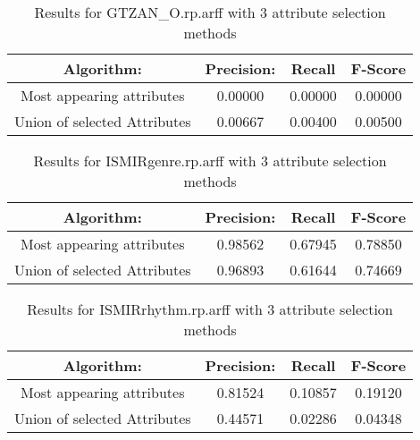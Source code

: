 \begin{table}[p]
\begin{center}
\begin{tabular}{|c|c|c|c|}
\hline Algorithm: & Precision: & Recall & F-Score\\
\hline Most appearing attributes & 0.00000 & 0.00000 & 0.00000\\
\hline Union of selected Attributes & 0.00667 & 0.00400 & 0.00500\\

\hline
\end{tabular}
\caption{Results for GTZAN\_O.rp.arff with 3 attribute selection methods}
\label{table:classifier:GTZAN\_O3}
\end{center}
\end{table}


\begin{table}[p]
\begin{center}
\begin{tabular}{|c|c|c|c|}
\hline Algorithm: & Precision: & Recall & F-Score\\
\hline Most appearing attributes & 0.98562 & 0.67945 & 0.78850\\
\hline Union of selected Attributes & 0.96893 & 0.61644 & 0.74669\\

\hline
\end{tabular}
\caption{Results for ISMIRgenre.rp.arff with 3 attribute selection methods}
\label{table:classifier:ISMIRgenre3}
\end{center}
\end{table}


\begin{table}[p]
\begin{center}
\begin{tabular}{|c|c|c|c|}
\hline Algorithm: & Precision: & Recall & F-Score\\
\hline Most appearing attributes & 0.81524 & 0.10857 & 0.19120\\
\hline Union of selected Attributes & 0.44571 & 0.02286 & 0.04348\\

\hline
\end{tabular}
\caption{Results for ISMIRrhythm.rp.arff with 3 attribute selection methods}
\label{table:classifier:ISMIRrhythm3}
\end{center}
\end{table}


